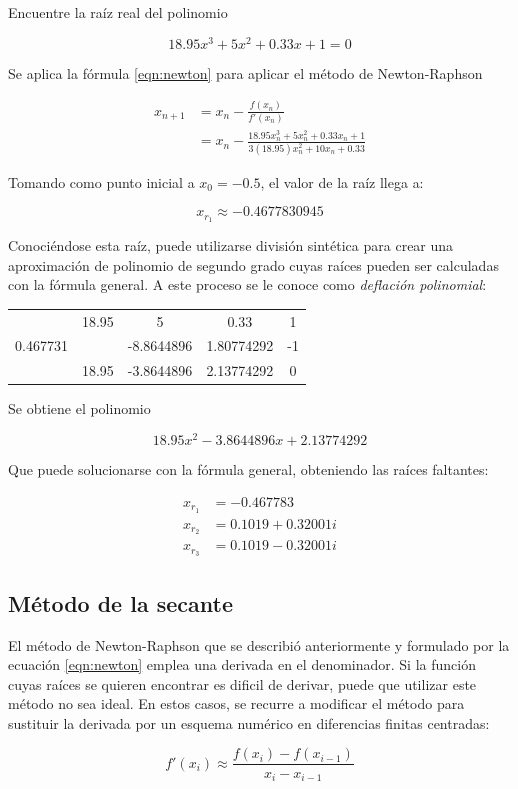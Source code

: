 \begin{ex}
	Encuentre la raíz real del polinomio 

	\[
		18.95x^3 + 5x^2  + 0.33x + 1 = 0
	\]

	\begin{solution}
		Se aplica la fórmula \ref{eqn:newton} para aplicar el método de
		Newton-Raphson

		\begin{align*}
			x_{n+1} &= x_n - \frac{f(x_n)}{f'(x_n)} \\
				&= x_n - \frac{18.95x_n^3 + 5x_n^2 + 0.33x_n +
				1}{3(18.95)x_n^2 + 10x_n + 0.33}
		\end{align*}

		Tomando como punto inicial a \(x_0 = -0.5 \), el valor de la raíz
		llega a:

		\[
			\boxed{x_{r_1} \approx -0.4677830945}
		\]

		Conociéndose esta raíz, puede utilizarse división sintética para
		crear una aproximación de polinomio de segundo grado cuyas
		raíces pueden ser calculadas con la fórmula general. A este
		proceso se le conoce como \textit{deflación polinomial}:

		\begin{center}
			\begin{tabular}{ c | c c c c }
				& 18.95 & 5 & 0.33 & 1 \\
			        0.467731 & & -8.8644896 & 1.80774292 & -1 \\
			 \hline
				 & 18.95 & -3.8644896 & 2.13774292 & 0
			\end{tabular}
		\end{center}

		Se obtiene el polinomio 

		\[
			18.95x^2 - 3.8644896x + 2.13774292
		\]

		Que puede solucionarse con la fórmula general, obteniendo las
		raíces faltantes:

		\begin{align*}
			x_{r_1} &= -0.467783 \\
			x_{r_2} &= 0.1019 + 0.32001 i \\
			x_{r_3} &= 0.1019 - 0.32001 i 
		\end{align*}
	\end{solution}

\end{ex}

\subsection{Método de la secante}

El método de Newton-Raphson que se describió anteriormente y formulado por la
ecuación \ref{eqn:newton} emplea una derivada en el denominador. Si la función
cuyas raíces se quieren encontrar es dificil de derivar, puede que utilizar este
método no sea ideal. En estos casos, se recurre a modificar el método para
sustituir la derivada por un esquema numérico en diferencias finitas centradas:

\[
	f'(x_i) \approx \frac{f(x_i) - f(x_{i-1})}{x_i - x_{i-1}}
\]
